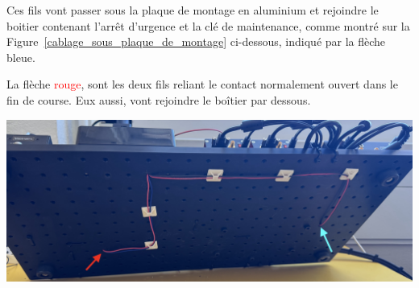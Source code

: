 \begin{minipage}[c]{0.48\textwidth}
    Ces fils vont passer sous la plaque de montage en aluminium et rejoindre le boitier contenant l'arrêt d'urgence et la clé de maintenance, comme montré sur la Figure~\ref{cablage_sous_plaque_de_montage} ci-dessous, indiqué par la flèche \textcolor[RGB]{115, 210, 210}{bleue}.

    \vspace{1em}
    La flèche \textcolor{red}{rouge}, sont les deux fils reliant le contact normalement ouvert dans le fin de course. Eux aussi, vont rejoindre le boîtier par dessous.
\end{minipage}\hfill
\begin{minipage}[c]{0.48\textwidth}
    \begin{center}
        \includegraphics[width=\textwidth]{assets/figures/Protections_laser/Securite_electrique/cablage_sous_plaque_de_montage.jpeg}
    \end{center}
    \label{cablage_sous_plaque_de_montage}
\end{minipage}

